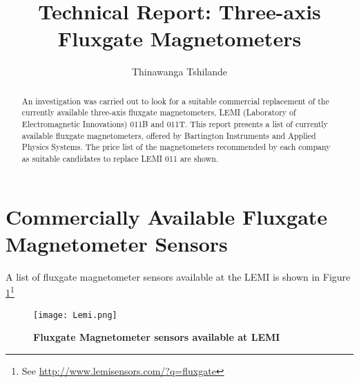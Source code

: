 \documentclass[a4paper,10pt]{report}
\title{Technical Report: Three-axis Fluxgate Magnetometers}
\author{Thinawanga Tshilande}
\begin{document}
\maketitle

\begin{abstract}
An investigation was carried out to look for a suitable commercial replacement of the
currently available three-axis fluxgate magnetometers, LEMI (Laboratory of
Electromagnetic Innovations) 011B and 011T. This report
presents a list of currently available fluxgate magnetometers, offered by Bartington 
Instruments and Applied Physics Systems. The price list of the magnetometers
recommended by each company as suitable candidates to replace LEMI 011 are shown. 
\end{abstract}
\section{Commercially Available Fluxgate Magnetometer Sensors}
A list of fluxgate magnetometer sensors available at the LEMI is shown in Figure
\ref{Lemi}\footnote{See \url{http://www.lemisensors.com/?q=fluxgate}}
\begin{figure}[!h]
\centering
\texttt{[image: Lemi.png]}
\caption{\textbf{Fluxgate Magnetometer sensors available at
LEMI}}
\label{Lemi}
\end{figure}
\end{document}
